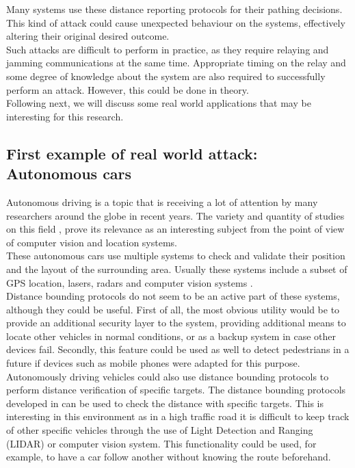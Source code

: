 \documentclass{article}
\begin{document}
Many systems use these distance reporting protocols for their pathing decisions. This kind of attack could cause unexpected behaviour on the systems, effectively altering their original desired outcome.\\

Such attacks are difficult to perform in practice, as they require relaying and jamming communications at the same time. Appropriate timing on the relay and some degree of knowledge about the system are also required to successfully perform an attack. However, this could be done in theory.\\

Following next, we will discuss some real world applications that may be interesting for this research.\\

\subsection{First example of real world attack: Autonomous cars}

Autonomous driving is a topic that is receiving a lot of attention by many researchers around the globe in recent years. The variety and quantity of studies on this field \cite{franke1999autonomous,continentalautonomous,levinsontowards,geiger2012we}, prove its relevance as an interesting subject from the point of view of computer vision and location systems.\\

These autonomous cars use multiple systems to check and validate their position and the layout of the surrounding area. Usually these systems include a subset of GPS location, lasers, radars and computer vision systems \cite{continentalautonomous,levinsontowards}.\\

Distance bounding protocols do not seem to be an active part of these systems, although they could be useful. First of all, the most obvious utility would be to provide an additional security layer to the system, providing additional means to locate other vehicles in normal conditions, or as a backup system in case other devices fail. Secondly, this feature could be used as well to detect pedestrians in a future if devices such as mobile phones were adapted for this purpose.\\

Autonomously driving vehicles could also use distance bounding protocols to perform distance verification of specific targets. The distance bounding protocols developed in  \cite{rasmussen2010realization, capkun2006secure} can be used to check the distance with specific targets. This is interesting in this environment as in a high traffic road it is difficult to keep track of other specific vehicles through the use of Light Detection and Ranging (LIDAR) or computer vision system. This functionality could be used, for example, to have a car follow another without knowing the route beforehand.\\
\end{document}

